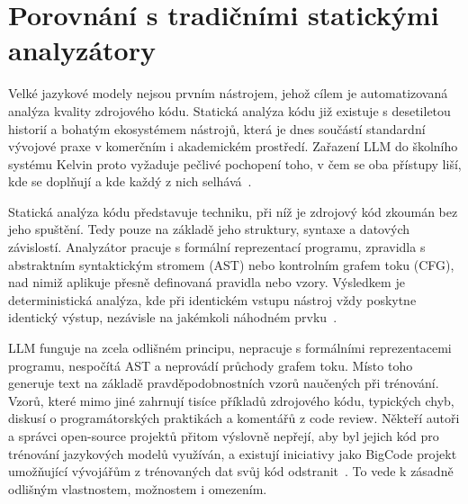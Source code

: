 



\section{Porovnání s tradičními statickými analyzátory}
\label{sec:llm-vs-static}

Velké jazykové modely nejsou prvním nástrojem, jehož cílem je automatizovaná analýza kvality zdrojového kódu.
Statická analýza kódu již existuje s desetiletou historií a bohatým ekosystémem nástrojů, která je dnes součástí standardní vývojové praxe v komerčním i akademickém prostředí.
Zařazení LLM do školního systému Kelvin proto vyžaduje pečlivé pochopení toho, v čem se oba přístupy liší, kde se doplňují a kde každý z nich selhává~\cite{moller-spa}.

Statická analýza kódu představuje techniku, při níž je zdrojový kód zkoumán bez jeho spuštění.
Tedy pouze na základě jeho struktury, syntaxe a datových závislostí.
Analyzátor pracuje s formální reprezentací programu, zpravidla s abstraktním syntaktickým stromem (AST) nebo kontrolním grafem toku (CFG), nad nimiž aplikuje přesně definovaná pravidla nebo vzory.
Výsledkem je deterministická analýza, kde při identickém vstupu nástroj vždy poskytne identický výstup, nezávisle na jakémkoli náhodném prvku~\cite{agileseekers-staticanalysis}.

LLM funguje na zcela odlišném principu, nepracuje s formálními reprezentacemi programu, nespočítá AST a neprovádí průchody grafem toku.
Místo toho generuje text na základě pravděpodobnostních vzorů naučených při trénování.
Vzorů, které mimo jiné zahrnují tisíce příkladů zdrojového kódu, typických chyb, diskusí o programátorských praktikách a komentářů z code review.
Někteří autoři a správci open-source projektů přitom výslovně nepřejí, aby byl jejich kód pro trénování jazykových modelů využíván, a existují iniciativy jako BigCode projekt umožňující vývojářům z trénovaných dat svůj kód odstranit~\cite{kocetkov-stack}.
To vede k zásadně odlišným vlastnostem, možnostem i omezením.





